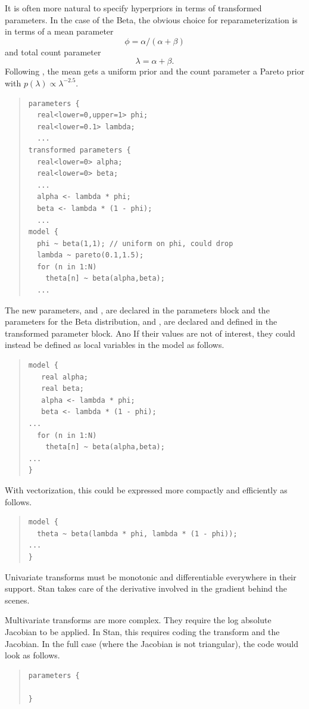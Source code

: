 It is often more natural to specify hyperpriors in terms of
transformed parameters.  In the case of the Beta, the obvious choice
for reparameterization is in terms of a mean parameter 
\[
\phi = \alpha / (\alpha + \beta)
\]
and total count parameter
\[
\lambda = \alpha + \beta.
\]
Following \citep[Chapter 5]{GelmanCarlinSternRubin:2003}, the mean
gets a uniform prior and the count parameter a Pareto prior with
$p(\lambda) \propto \lambda^{-2.5}$.
%
\begin{quote}
\begin{Verbatim}
parameters {
  real<lower=0,upper=1> phi;
  real<lower=0.1> lambda;
  ...
transformed parameters {
  real<lower=0> alpha;
  real<lower=0> beta;
  ...
  alpha <- lambda * phi;
  beta <- lambda * (1 - phi);
  ...
model {
  phi ~ beta(1,1); // uniform on phi, could drop
  lambda ~ pareto(0.1,1.5);
  for (n in 1:N)
    theta[n] ~ beta(alpha,beta);
  ...
\end{Verbatim}
\end{quote}
%
The new parameters,  and , are declared in the
parameters block and the parameters for the Beta distribution, 
 and , are declared and defined in the
transformed parameter block.  Ano If their values are not of interest,
they could instead be defined as local variables in the model as
follows.
%
\begin{quote}
\begin{Verbatim}
model {
   real alpha;
   real beta;
   alpha <- lambda * phi;
   beta <- lambda * (1 - phi);
...
  for (n in 1:N)
    theta[n] ~ beta(alpha,beta);
...
}
\end{Verbatim}
\end{quote}
%
With vectorization, this could be expressed more compactly and
efficiently as follows.
\begin{quote}
\begin{Verbatim}
model {
  theta ~ beta(lambda * phi, lambda * (1 - phi));
...
}
\end{Verbatim}
\end{quote}
%

Univariate transforms must be monotonic and differentiable everywhere
in their support.  Stan takes care of the derivative involved in the
gradient behind the scenes.  

Multivariate transforms are more complex.  They require the log
absolute Jacobian to be applied.  In Stan, this requires coding the
transform and the Jacobian.  In the full case (where the Jacobian is
not triangular), the code would look as follows.
%
\begin{quote}
\begin{Verbatim}
parameters {

}
\end{Verbatim}
\end{quote}




